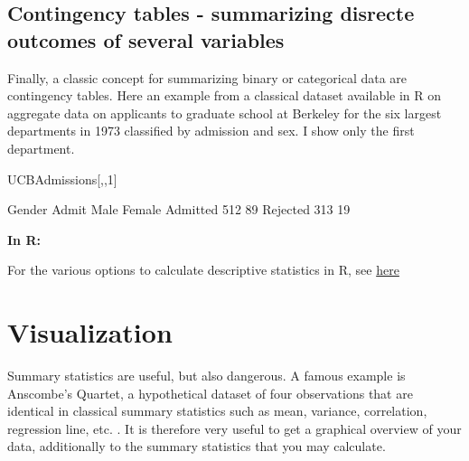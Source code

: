 \documentclass[a4paper,twoside]{tufte-book}\usepackage[]{graphicx}\usepackage[]{color}
\begin{document}
\subsection{Contingency tables - summarizing disrecte outcomes of several variables}

Finally, a classic concept for summarizing binary or categorical data are contingency tables. Here an example from a classical dataset available in R on aggregate data on applicants to graduate school at Berkeley for the six largest departments in 1973 classified by admission and sex. I show only the first department.

\begin{Schunk}
\begin{Sinput}
UCBAdmissions[,,1]
\end{Sinput}
\begin{Soutput}
          Gender
Admit      Male Female
  Admitted  512     89
  Rejected  313     19
\end{Soutput}
\end{Schunk}


\vspace{1cm}
\begin{fullwidth}
\begin{mdframed}
    
\textbf{In R:} 

For the various options to calculate descriptive statistics in R, see \href{http://www.uni-kiel.de/psychologie/rexrepos/rerDescriptive.html}{here}

\end{mdframed}
\end{fullwidth} 


\section{Visualization}


Summary statistics are useful, but also dangerous. A famous example is Anscombe's Quartet, a hypothetical dataset of four observations that are identical in classical summary statistics such as mean, variance, correlation, regression line, etc. \citep{Anscombe-Graphsinstatistical-1973}. It is therefore very useful to get a graphical overview of your data, additionally to the summary statistics that you may calculate.
\end{document}
